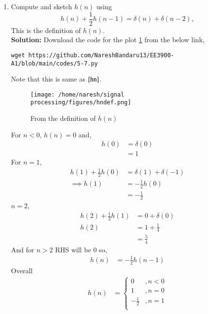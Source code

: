 \documentclass[journal,12pt,twocolumn]{IEEEtran}
\renewcommand\thesection{\arabic{section}}
\newcommand{\solution}{\noindent \textbf{Solution: }}
\providecommand{\brak}[1]{\ensuremath{\left(#1\right)}}
\numberwithin{equation}{section}
\renewcommand\thesection{\arabic{section}}
\begin{document}
\begin{enumerate}[label=\thesection.\arabic*]
   
   
\item Compute and sketch $h(n)$ using 
     \begin{equation}
      \label{eq:iir_filter_h}
      h(n) + \frac{1}{2}h(n-1) = \delta(n) + \delta(n-2), 
     \end{equation}
        This is the definition of $h(n)$.\\
    \solution Download the code for the plot \ref{hndef} from the below link,
     \begin{lstlisting}
wget https://github.com/NareshBandaru13/EE3900-A1/blob/main/codes/5-7.py
     \end{lstlisting}
     Note that this is same as $\ref{hn}$.\\
     \begin{figure}[ht!]
      \centering
      \texttt{[image: /home/naresh/signal processing/figures/hndef.png]}
      \caption{From the definition of $h(n)$}
      \label{hndef}
     \end{figure}
    For $n <0$, $h\brak{n} = 0$ and,
     \begin{align} 
       h\brak{0} &= \delta\brak{0}\\
                 &= 1
     \end{align}
    For $n =1$,
     \begin{align} 
       h\brak{1} + \frac{1}{2}h\brak{0} &= \delta\brak{1} + \delta\brak{-1}\\
      \implies  h\brak{1}&= -\frac{1}{2}h\brak{0}\\
                         &= -\frac{1}{2}
     \end{align}
    $n=2$,
      \begin{align}
        h\brak{2} + \frac{1}{2}h\brak{1} &= 0 + \delta\brak{0}\\
              h\brak{2} &= 1 + \frac{1}{4}\\
                        &= \frac{5}{4}
      \end{align}
    And for $n>2$ RHS will be $0$ so,
      \begin{align}
        h\brak{n} &= -\frac{1}{2}h\brak{n-1}
      \end{align}
    Overall 
      \begin{align}
         h\brak{n} &= \begin{cases}
                          0  &, n <0 \\
                          1  &, n = 0 \\
                        -\frac{1}{2} &, n=1 \\

\end{cases}
\end{align}
\end{enumerate}
\end{document}
